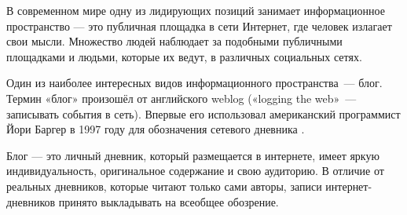 




В современном мире одну из лидирующих позиций занимает информационное пространство — это публичная площадка в сети Интернет, где человек излагает свои мысли.
Множество людей наблюдает за подобными публичными площадками и людьми, которые их ведут, в различных социальных сетях.

Один из наиболее интересных видов информационного пространства~— блог.
Термин «блог» произошёл от английского weblog («logging the web»~— записывать события в сеть).
Впервые его использовал американский программист Йори Баргер в 1997 году для обозначения сетевого дневника \cite{lagoshina}.

Блог — это личный дневник, который размещается в интернете, имеет яркую индивидуальность, оригинальное содержание и свою аудиторию.
В отличие от реальных дневников, которые читают только сами авторы, записи интернет-дневников принято выкладывать на всеобщее обозрение.

